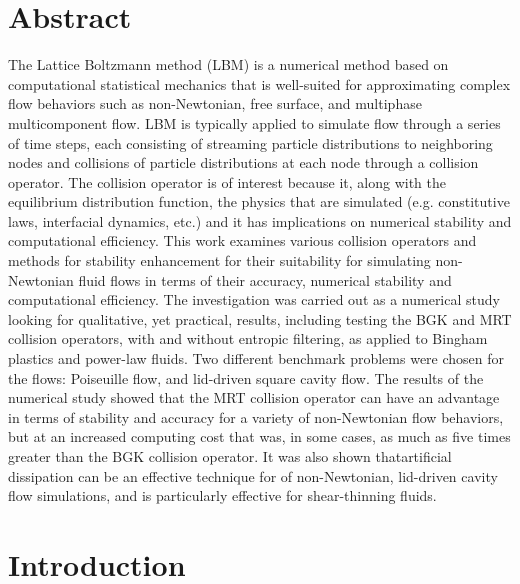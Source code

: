 \section*{Abstract}

The Lattice Boltzmann method (LBM) is a numerical method based on computational statistical mechanics that is well-suited for approximating complex flow behaviors such as non-Newtonian, free surface, and multiphase multicomponent flow.
LBM is typically applied to simulate flow through a series of time steps, each consisting of streaming particle distributions to neighboring nodes and collisions of particle distributions at each node through a collision operator.
The collision operator is of interest because it, along with the equilibrium distribution function, \DIFdelbegin {}\DIFdelend \DIFaddbegin {}\DIFaddend the physics that are simulated (e.g. constitutive laws, interfacial dynamics, etc.) and it has implications on numerical stability and computational efficiency.
This work examines various collision operators and methods for stability enhancement for their suitability for simulating non-Newtonian fluid flows in terms of their accuracy, numerical stability and computational efficiency.
The investigation was carried out as a numerical study looking for qualitative, yet practical, results, including testing the BGK and MRT collision operators, with and without entropic filtering, as applied to Bingham plastics and power-law fluids.
Two different benchmark problems were chosen for the flows: Poiseuille flow, and lid-driven square cavity flow.
The results of the numerical study showed that the MRT collision operator can have an advantage in terms of stability and accuracy for a variety of non-Newtonian flow behaviors, but at an increased computing cost that was, in some cases, as much as five times greater than the BGK collision operator.
It was also shown that\DIFaddbegin {}\DIFaddend artificial dissipation can be an effective technique for \DIFdelbegin {}\DIFdelend \DIFaddbegin {}\DIFaddend of non-Newtonian, lid-driven cavity flow simulations, and is particularly effective for \DIFdelbegin {}\DIFdelend \DIFaddbegin {}\DIFaddend shear-thinning fluids.

\section{Introduction}


